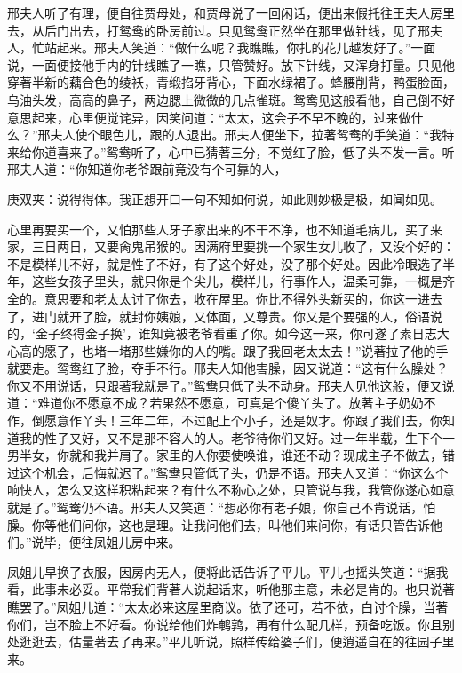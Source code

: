 \begin{parag}
    邢夫人听了有理，便自往贾母处，和贾母说了一回闲话，便出来假托往王夫人房里去，从后门出去，打鸳鸯的卧房前过。只见鸳鸯正然坐在那里做针线，见了邢夫人，忙站起来。邢夫人笑道：“做什么呢？我瞧瞧，你扎的花儿越发好了。”一面说，一面便接他手内的针线瞧了一瞧，只管赞好。放下针线，又浑身打量。只见他穿著半新的藕合色的绫袄，青缎掐牙背心，下面水绿裙子。蜂腰削背，鸭蛋脸面，乌油头发，高高的鼻子，两边腮上微微的几点雀斑。鸳鸯见这般看他，自己倒不好意思起来，心里便觉诧异，因笑问道：“太太，这会子不早不晚的，过来做什么？”邢夫人使个眼色儿，跟的人退出。邢夫人便坐下，拉著鸳鸯的手笑道：“我特来给你道喜来了。”鸳鸯听了，心中已猜著三分，不觉红了脸，低了头不发一言。听邢夫人道：“你知道你老爷跟前竟没有个可靠的人，\begin{note}庚双夹：说得得体。我正想开口一句不知如何说，如此则妙极是极，如闻如见。\end{note}心里再要买一个，又怕那些人牙子家出来的不干不净，也不知道毛病儿，买了来家，三日两日，又要肏鬼吊猴的。因满府里要挑一个家生女儿收了，又没个好的：不是模样儿不好，就是性子不好，有了这个好处，没了那个好处。因此冷眼选了半年，这些女孩子里头，就只你是个尖儿，模样儿，行事作人，温柔可靠，一概是齐全的。意思要和老太太讨了你去，收在屋里。你比不得外头新买的，你这一进去了，进门就开了脸，就封你姨娘，又体面，又尊贵。你又是个要强的人，俗语说的，‘金子终得金子换’，谁知竟被老爷看重了你。如今这一来，你可遂了素日志大心高的愿了，也堵一堵那些嫌你的人的嘴。跟了我回老太太去！”说著拉了他的手就要走。鸳鸯红了脸，夺手不行。邢夫人知他害臊，因又说道：“这有什么臊处？你又不用说话，只跟著我就是了。”鸳鸯只低了头不动身。邢夫人见他这般，便又说道：“难道你不愿意不成？若果然不愿意，可真是个傻丫头了。放著主子奶奶不作，倒愿意作丫头！三年二年，不过配上个小子，还是奴才。你跟了我们去，你知道我的性子又好，又不是那不容人的人。老爷待你们又好。过一年半载，生下个一男半女，你就和我并肩了。家里的人你要使唤谁，谁还不动？现成主子不做去，错过这个机会，后悔就迟了。”鸳鸯只管低了头，仍是不语。邢夫人又道：“你这么个响快人，怎么又这样积粘起来？有什么不称心之处，只管说与我，我管你遂心如意就是了。”鸳鸯仍不语。邢夫人又笑道：“想必你有老子娘，你自己不肯说话，怕臊。你等他们问你，这也是理。让我问他们去，叫他们来问你，有话只管告诉他们。”说毕，便往凤姐儿房中来。
\end{parag}


\begin{parag}
    凤姐儿早换了衣服，因房内无人，便将此话告诉了平儿。平儿也摇头笑道：“据我看，此事未必妥。平常我们背著人说起话来，听他那主意，未必是肯的。也只说著瞧罢了。”凤姐儿道：“太太必来这屋里商议。依了还可，若不依，白讨个臊，当著你们，岂不脸上不好看。你说给他们炸鹌鹑，再有什么配几样，预备吃饭。你且别处逛逛去，估量著去了再来。”平儿听说，照样传给婆子们，便逍遥自在的往园子里来。
\end{parag}



